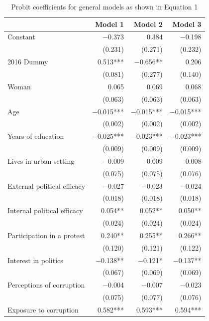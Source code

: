 \documentclass[floatsintext,man]{apa7}\usepackage[]{graphicx}\usepackage[]{color}
\begin{document}
\begin{longtable}[t]{lrrr}
\caption{\label{tab:complexmodprob}Probit coefficients for general models as shown in Equation 1}\\
\toprule
  & Model 1 & Model 2 & Model 3\\
\midrule
Constant & \num{-0.373} & \num{0.384} & \num{-0.198}\\
 & (\num{0.231}) & (\num{0.271}) & (\num{0.232})\\
2016 Dummy & \num{0.513}*** & \num{-0.656}** & \num{0.206}\\
 & (\num{0.081}) & (\num{0.277}) & (\num{0.140})\\
Woman & \num{0.065} & \num{0.069} & \num{0.068}\\
 & (\num{0.063}) & (\num{0.063}) & (\num{0.063})\\
Age & \num{-0.015}*** & \num{-0.015}*** & \num{-0.015}***\\
 & (\num{0.002}) & (\num{0.002}) & (\num{0.002})\\
Years of education & \num{-0.025}*** & \num{-0.023}*** & \num{-0.023}***\\
 & (\num{0.009}) & (\num{0.009}) & (\num{0.009})\\
Lives in urban setting & \num{-0.009} & \num{0.009} & \num{0.008}\\
 & (\num{0.075}) & (\num{0.075}) & (\num{0.076})\\
External political efficacy & \num{-0.027} & \num{-0.023} & \num{-0.024}\\
 & (\num{0.018}) & (\num{0.018}) & (\num{0.018})\\
Internal political efficacy & \num{0.054}** & \num{0.052}** & \num{0.050}**\\
 & (\num{0.024}) & (\num{0.024}) & (\num{0.024})\\
Participation in a protest & \num{0.240}** & \num{0.255}** & \num{0.266}**\\
 & (\num{0.120}) & (\num{0.121}) & (\num{0.122})\\
Interest in politics & \num{-0.138}** & \num{-0.121}* & \num{-0.137}**\\
 & (\num{0.067}) & (\num{0.069}) & (\num{0.069})\\
Perceptions of corruption & \num{-0.004} & \num{-0.007} & \num{-0.023}\\
 & (\num{0.075}) & (\num{0.077}) & (\num{0.076})\\
Exposure to corruption & \num{0.582}*** & \num{0.593}*** & \num{0.594}***\\

\end{longtable}
\end{document}
